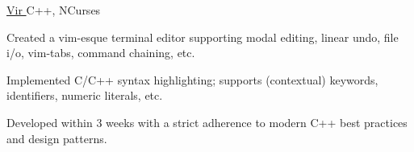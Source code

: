 \begin{cventries}
  \cvprojectentry
    {\href{http://rjackson2000.com/\#vir}{Vir \faGithubSquare\acvHeaderIconSep}} %
    {C++, NCurses} %
    {
      \begin{cvitems} %
      \item {Created a vim-esque terminal editor supporting modal editing, linear undo, file i/o, vim-tabs, command chaining, etc.}
      \item {Implemented C/C++ syntax highlighting; supports (contextual) keywords, identifiers, numeric literals, etc.}
      \item {Developed within 3 weeks with a strict adherence to modern C++ best practices and design patterns.}
      \end{cvitems}
    }

\end{cventries}
